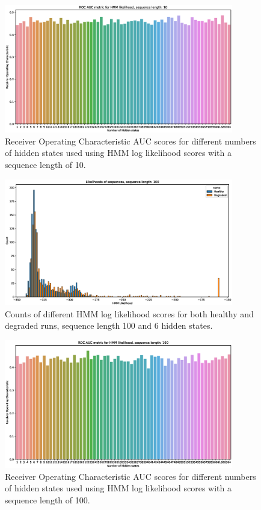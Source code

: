 \documentclass[journal]{IEEEtran}
\begin{document}
\begin{figure}[tb]
 \centering
 \includegraphics[width=10cm,keepaspectratio=true]{./roc_hmm_score_10.eps}
 \caption{Receiver Operating Characteristic AUC scores for different numbers of hidden states used using HMM log likelihood scores with a sequence length of 10.}
 \label{figure:roc_log_likelihoods_10}
\end{figure}

\begin{figure}[tb]
 \centering
 \includegraphics[width=10cm,keepaspectratio=true]{./hmm_histograms_100.eps}
 \caption{Counts of different HMM log likelihood scores for both healthy and degraded runs, sequence length 100 and 6 hidden states.}
 \label{figure:log_likelihood_100}
\end{figure}

\begin{figure}[tb]
 \centering
 \includegraphics[width=10cm,keepaspectratio=true]{./roc_hmm_score_100.eps}
 \caption{Receiver Operating Characteristic AUC scores for different numbers of hidden states used using HMM log likelihood scores with a sequence length of 100.}
 \label{figure:roc_log_likelihoods_100}
\end{figure}
\end{document}
